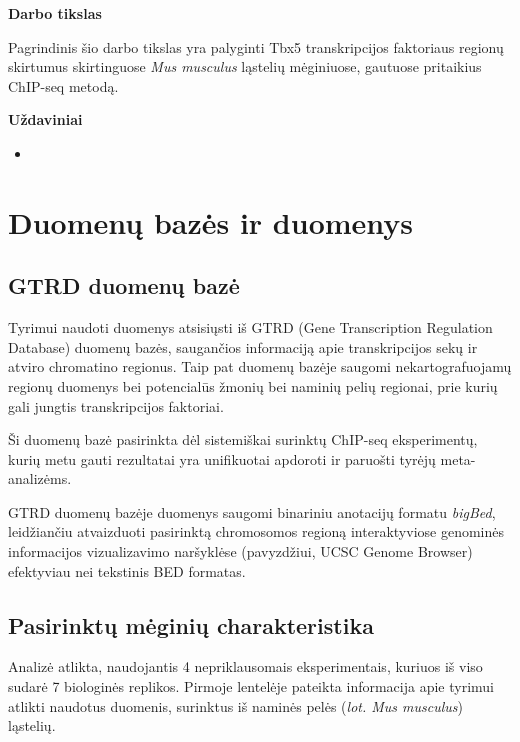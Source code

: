 \documentclass[12pt]{article}
\begin{document}
\textbf{Darbo tikslas}

Pagrindinis šio darbo tikslas yra palyginti Tbx5 transkripcijos faktoriaus
regionų skirtumus skirtinguose \emph{Mus musculus} ląstelių mėginiuose,
gautuose pritaikius ChIP-seq metodą.
\hfill \break

\textbf{Uždaviniai}
\begin{itemize}
    \item
\end{itemize}


\newpage

\section{Duomenų bazės ir duomenys}
\subsection{GTRD duomenų bazė}
Tyrimui naudoti duomenys atsisiųsti iš GTRD
(Gene Transcription Regulation Database)\cite{GTRD}
duomenų bazės, saugančios informaciją apie transkripcijos
sekų ir atviro chromatino regionus. Taip pat duomenų bazėje saugomi
nekartografuojamų regionų duomenys bei potencialūs žmonių bei naminių
pelių regionai, prie kurių gali jungtis transkripcijos faktoriai.

Ši duomenų bazė pasirinkta dėl sistemiškai surinktų
ChIP-seq eksperimentų, kurių metu gauti rezultatai yra unifikuotai
apdoroti ir paruošti tyrėjų meta-analizėms.

GTRD duomenų bazėje duomenys saugomi binariniu anotacijų
formatu \emph{bigBed}, leidžiančiu atvaizduoti pasirinktą
chromosomos regioną interaktyviose genominės informacijos
vizualizavimo naršyklėse (pavyzdžiui, UCSC Genome Browser\cite{UCSCGB})
efektyviau nei tekstinis BED formatas.

\subsection{Pasirinktų mėginių charakteristika}
Analizė atlikta, naudojantis 4 nepriklausomais eksperimentais, kuriuos
iš viso sudarė 7 biologinės replikos.
Pirmoje lentelėje pateikta informacija apie tyrimui atlikti
naudotus duomenis, surinktus iš naminės pelės (\emph{lot. Mus musculus})
ląstelių.
\end{document}
